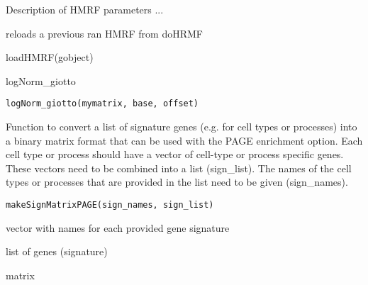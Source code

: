 \documentclass[a4paper]{book}
\begin{document}
%
\begin{Details}\relax
Description of HMRF parameters ...
\end{Details}
%
\begin{Value}
reloads a previous ran HMRF from doHRMF
\end{Value}
%
\begin{Examples}
\begin{ExampleCode}
    loadHMRF(gobject)
\end{ExampleCode}
\end{Examples}
%
\begin{Description}\relax
logNorm\_giotto
\end{Description}
%
\begin{Usage}
\begin{verbatim}
logNorm_giotto(mymatrix, base, offset)
\end{verbatim}
\end{Usage}
%
\begin{Description}\relax
Function to convert a list of signature genes (e.g. for cell types or processes) into
a binary matrix format that can be used with the PAGE enrichment option. Each cell type or process should
have a vector of cell-type or process specific genes. These vectors need to be combined into a list (sign\_list).
The names of the cell types or processes that are provided in the list need to be given (sign\_names).
\end{Description}
%
\begin{Usage}
\begin{verbatim}
makeSignMatrixPAGE(sign_names, sign_list)
\end{verbatim}
\end{Usage}
%
\begin{Arguments}
\begin{ldescription}
\item[\code{sign\_names}] vector with names for each provided gene signature

\item[\code{sign\_list}] list of genes (signature)
\end{ldescription}
\end{Arguments}
%
\begin{Value}
matrix
\end{Value}
%
\begin{SeeAlso}\relax
{}
\end{SeeAlso}
\end{document}
